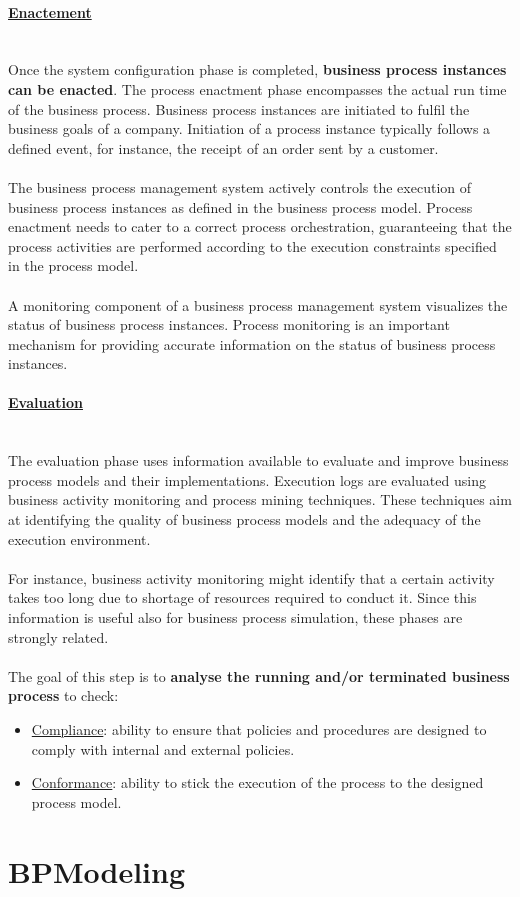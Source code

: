 \documentclass[10pt,a4paper]{article}
\newcommand{\myparagraph}[1]{\paragraph{\uline{#1}}\mbox{}\\[0.05in]}
\begin{document}
\myparagraph{Enactement}
Once the system configuration phase is completed, \textbf{business process instances can be enacted}. The process enactment phase encompasses the actual run time of the business process. Business process instances are initiated to fulfil the business goals of a company. Initiation of a process instance typically follows a defined event, for instance, the receipt of an order sent by a customer. \\ \\ 
The business process management system actively controls the execution of business process instances as defined in the business process model. Process enactment needs to cater to a correct process orchestration, guaranteeing that the process activities are performed according to the execution constraints specified in the process model.
\\ \\
A monitoring component of a business process management system visualizes the status of business process instances. Process monitoring is an important mechanism for providing accurate information on the status of business process instances.
\myparagraph{Evaluation}
The evaluation phase uses information available to evaluate and improve business process models and their implementations. Execution logs are evaluated using business activity monitoring and process mining techniques. These techniques aim at identifying the quality of business process models and the adequacy of the execution environment. \\ \\
For instance, business activity monitoring might identify that a certain activity takes too long due to shortage of resources required to conduct it. Since this information is useful also for business process simulation, these phases are strongly related.
\\ \\
The goal of this step is to \textbf{analyse the running and/or terminated business process} to check:
\begin{itemize}
	\item \uline{Compliance}: ability to ensure that policies and procedures are designed to comply with internal and external policies.
	\item \uline{Conformance}: ability to stick the execution of the process to the designed process model. 
\end{itemize}
\pagebreak
\section{BPModeling}
\end{document}
